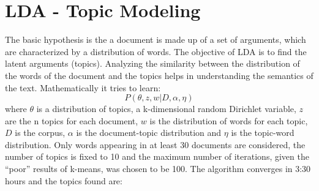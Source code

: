\documentclass[fleqn,10pt]{SelfArx}
\begin{document}
\section{LDA - Topic Modeling}
The basic hypothesis is the a document is made up of a set of arguments, which are characterized by a distribution of words.
The objective of LDA \cite{lda} is to find the latent arguments (topics). Analyzing the similarity between the distribution of the words of the document and the topics helps in understanding the semantics of the text.
Mathematically it tries to learn:
$$P(\theta, z, w|D,\alpha, \eta)$$
where $\theta$ is a distribution of topics, a k-dimensional random Dirichlet variable, $z$ are the n topics for each document, $w$ is the distribution of words for each topic, $D$ is the corpus, $\alpha$ is the document-topic distribution and $\eta$ is the topic-word distribution.
Only words appearing in at least 30 documents are considered, the number of topics is fixed to 10 and the maximum number of iterations, given the ``poor'' results of k-means, was chosen to be 100.
The algorithm converges in 3:30 hours and the topics found are:
\end{document}
